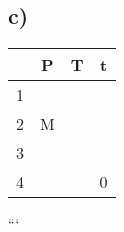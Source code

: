 

\subsection*{c)}
\begin{tabular}{|c|c|c|c|}
    \hline
    & P & T & t \\
    \hline
    1 & & & \\
    \hline
    2 & M & & \\
    \hline
    3 & & & \\
    \hline
    4 & & & 0 \\
    \hline
\end{tabular}

```